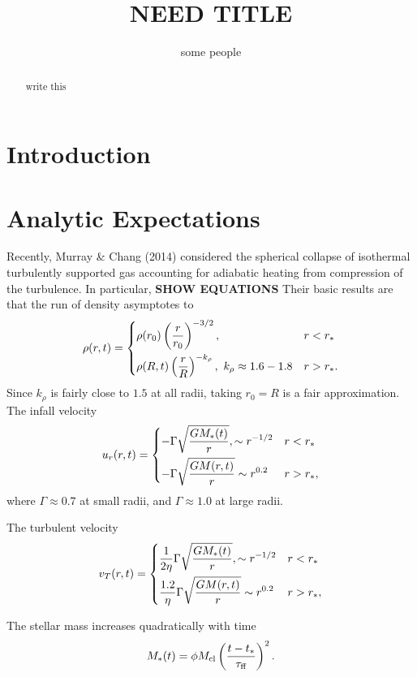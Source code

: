 \documentclass{emulateapj}
\newcommand{\be}{\begin{equation}}
\newcommand{\ee}{\end{equation}}
\newcommand       \etaeff       {\eta}
\newcommand       \tff          {\tau_{\rm ff}}
\begin{document}
\title{NEED TITLE}

\author{some people}


\begin{abstract}

write this

\end{abstract}


\section{Introduction}

\section{Analytic Expectations}

Recently, Murray \& Chang (2014) considered the spherical collapse of isothermal turbulently supported gas accounting for adiabatic heating from compression of the turbulence. In particular,  {\bf SHOW EQUATIONS}
Their basic results are that the run of density asymptotes to 
\be
\rho(r,t)=
\begin{dcases}
\rho(r_0)\left({r\over r_0}\right)^{-3/2}, & r<r_*\\
\rho(R,t)\left({r\over R}\right)^{-k_\rho}, \ k_\rho\approx1.6-1.8 & r>r_*.
\end{dcases}
\ee
Since $k_\rho$ is fairly close to $1.5$ at all radii, taking $r_0=R$
is a fair approximation. 
The infall velocity 
%
\be
u_r(r,t)=
\begin{dcases}
-\Gamma\sqrt{GM_*(t)\over r}, \sim r^{-1/2} & r<r_*\\
-\Gamma\sqrt{GM(r,t)\over r} \sim r^{0.2} & r>r_*,
\end{dcases}
\ee
%
where $\Gamma \approx 0.7$ at small radii, and $\Gamma\approx 1.0$ at
large radii. 

The turbulent velocity 
%
\be
v_T(r,t)=
\begin{dcases}
{1\over 2\etaeff}\Gamma\sqrt{GM_*(t)\over r}, \sim r^{-1/2} & r<r_*\\
{1.2\over \etaeff}\Gamma\sqrt{GM(r,t)\over r} \sim r^{0.2} & r>r_*,
\end{dcases}
\ee
%

The stellar mass increases quadratically with time
%
\be  %
M_*(t)=\phi M_{\rm cl}\left({t-t_*\over \tff}\right)^2.
\ee  %
%
\end{document}
